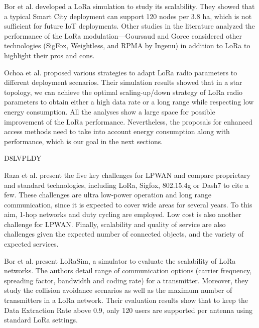 Bor et al.
\cite{bor_lora_nodate} developed a LoRa simulation to study its scalability.
They showed that a typical Smart City deployment can support 120 nodes per 3.8 ha,
	which is not sufficient for future IoT deployments.
Other studies in the literature analyzed the performance of the LoRa modulation—Goursaud and Gorce \cite{goursaud_dedicated_2015} considered other technologies (SigFox,
	Weightless,
	and RPMA by Ingenu) in addition to LoRa to highlight their pros and cons.

Ochoa et al.
\cite{ochoa_evaluating_2017} proposed various strategies to adapt LoRa radio parameters to different deployment scenarios.
Their simulation results showed that in a star topology,
	we can achieve the optimal scaling-up/down strategy of LoRa radio parameters to obtain either a high data rate or a long range while respecting low energy consumption.
All the analyses show a large space for possible improvement of the LoRa performance.
Nevertheless,
	the proposals for enhanced access methods need to take into account energy consumption along with performance,
	which is our goal in the next sections.

\cite{zorbas_improving_2018} D8LVPLDY

Raza et al.
\cite{raza_low_2017} present the five key challenges for LPWAN and compare proprietary and standard technologies,
	including LoRa,
	Sigfox, 802.15.4g or Dash7 to cite a few.
These challenges are ultra low-power operation and long range communication,
	since it is expected to cover wide areas for several years.
To this aim, 1-hop networks and duty cycling are employed.
Low cost is also another challenge for LPWAN.
Finally,
	scalability and quality of service are also challenges given the expected number of connected objects,
	and the variety of expected services.

Bor et al.
\cite{bor_lora_2016} present LoRaSim,
	a simulator to evaluate the scalability of LoRa networks.
The authors detail range of communication options (carrier frequency,
	spreading factor,
	bandwidth and coding rate) for a transmitter.
Moreover,
	they study the collision avoidance scenarios as well as the maximum number of transmitters in a LoRa network.
Their evaluation results show that to keep the Data Extraction Rate above 0.9,
	only 120 users are supported per antenna using standard LoRa settings.

